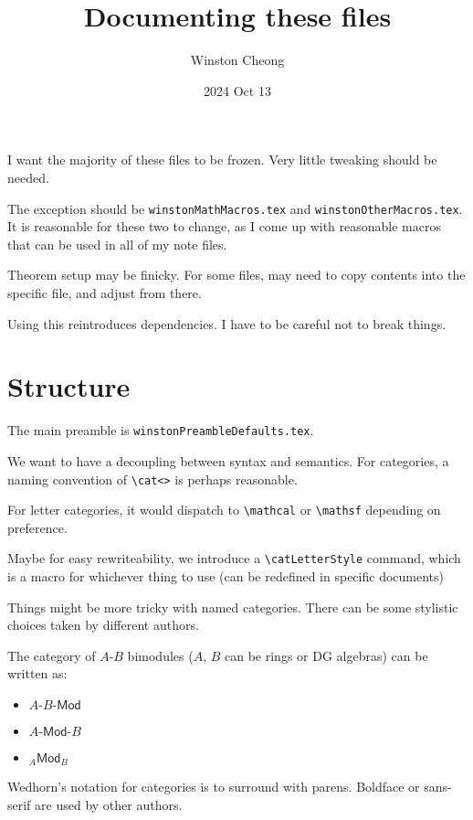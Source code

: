 \documentclass{scrartcl}
\title{Documenting these files}
\author{Winston Cheong}
\date{2024 Oct 13}
\begin{document}
\maketitle

I want the majority of these files to be frozen.
Very little tweaking should be needed.

The exception should be \texttt{winstonMathMacros.tex} and
\texttt{winstonOtherMacros.tex}.
It is reasonable for these two to change, as I come up with reasonable macros that can be used in all of my note files.

Theorem setup may be finicky. For some files, may need to copy contents into the
specific file, and adjust from there.



Using this reintroduces dependencies. I have to be careful not to break things.

\section{Structure}

The main preamble is \texttt{winstonPreambleDefaults.tex}.

We want to have a decoupling between syntax and semantics.
For categories, a naming convention of \verb|\cat<>| is perhaps reasonable.

For letter categories, it would dispatch to \verb|\mathcal| or \verb|\mathsf| depending on preference.

Maybe for easy rewriteability, we introduce a \verb|\catLetterStyle| command,
which is a macro for whichever thing to use (can be redefined in specific
documents)

Things might be more tricky with named categories. There can be some stylistic
choices taken by different authors.

The category of $A$-$B$ bimodules ($A$, $B$ can be rings or DG algebras) can be written as:
\begin{itemize}
    \item $A\text{-}B\text{-}\mathsf{Mod}$
    \item $A\text{-}\mathsf{Mod}\text{-}B$
    \item ${}_A\mathsf{Mod}_{B}$
\end{itemize}


Wedhorn's notation for categories is to surround with parens.
Boldface or sans-serif are used by other authors.
\end{document}
